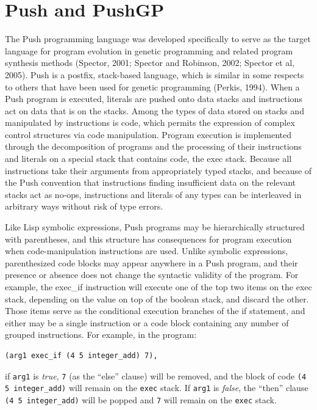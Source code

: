 \documentclass[graybox]{svmult}
\begin{document}
\section{Push and PushGP}
\label{pushgp}

The Push programming language was developed specifically to serve as the target language for program evolution in genetic programming and related program synthesis methods
(Spector, 2001; Spector and Robinson, 2002; Spector et al, 2005). Push is a postfix, stack-based language, which is similar in some respects to others that have been used for genetic programming (Perkis, 1994). 
When a Push program is executed, literals are pushed
onto data stacks and instructions act on data that is on the stacks.
Among the types of data stored on stacks and manipulated by instructions is {\ttfamily code}, which permits the expression of complex control structures via code manipulation. Program execution is implemented through the decomposition of programs and the processing of their instructions and literals on a special stack that contains code, the {\ttfamily exec} stack.
Because all instructions take their arguments from appropriately typed stacks, and because of the Push convention that instructions finding insufficient data on the relevant stacks
act as {\ttfamily no-op}s, instructions and literals of any types can be interleaved in arbitrary ways without risk of type errors.

Like Lisp symbolic expressions, Push programs may be hierarchically
structured with parentheses, and this structure has consequences for program execution when code-manipulation instructions are used. Unlike symbolic expressions, parenthesized code blocks may appear anywhere in a Push program, and their presence or absence does not change the syntactic validity of the program. For example, the {\ttfamily exec\_if} instruction will execute one of the top two items on the {\ttfamily exec} stack, depending on the value on top of the {\ttfamily boolean} stack, and discard the other. Those items serve as the conditional execution branches of the if statement, and either may be a single instruction or a code block containing any number of grouped instructions. For example, in the program:
\begin{verbatim}
(arg1 exec_if (4 5 integer_add) 7),
\end{verbatim}
if \texttt{arg1} is \textit{true}, \texttt{7} (as the ``else'' clause) will be removed, and the block of code \texttt{(4 5 integer\_add)} will remain on the \texttt{exec} stack. If \texttt{arg1} is \textit{false}, the ``then'' clause \texttt{(4 5 integer\_add)} will be popped and \texttt{7} will remain on the \texttt{exec} stack.
\end{document}
